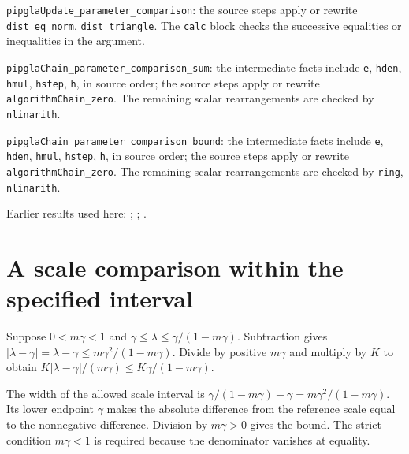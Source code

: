 \documentclass[11pt,a4paper]{article}
\begin{document}
\begin{leanbox}
\texttt{pipgla\allowbreak{}Update\_\allowbreak{}parameter\_\allowbreak{}comparison}: the source steps apply or rewrite \texttt{dist\_\allowbreak{}eq\_\allowbreak{}norm}, \texttt{dist\_\allowbreak{}triangle}. The \texttt{calc} block checks the successive equalities or inequalities in the argument.



\texttt{pipgla\allowbreak{}Chain\_\allowbreak{}parameter\_\allowbreak{}comparison\_\allowbreak{}sum}: the intermediate facts include \texttt{e}, \texttt{hden}, \texttt{hmul}, \texttt{hstep}, \texttt{h}, in source order; the source steps apply or rewrite \texttt{algorithm\allowbreak{}Chain\_\allowbreak{}zero}. The remaining scalar rearrangements are checked by \texttt{nlinarith}.



\texttt{pipgla\allowbreak{}Chain\_\allowbreak{}parameter\_\allowbreak{}comparison\_\allowbreak{}bound}: the intermediate facts include \texttt{e}, \texttt{hden}, \texttt{hmul}, \texttt{hstep}, \texttt{h}, in source order; the source steps apply or rewrite \texttt{algorithm\allowbreak{}Chain\_\allowbreak{}zero}. The remaining scalar rearrangements are checked by \texttt{ring}, \texttt{nlinarith}.
\end{leanbox}


Earlier results used here: \cite[Section~3.15.1]{LangevinLean2026ULASC}; \cite[Section~3.15.3]{LangevinLean2026ULASC}; \cite[Section~3.1.1]{LangevinLean2026IPLA}.

\section{\texorpdfstring{A scale comparison within the specified interval}{A scale comparison within the specified interval}}


Suppose \(0<m\gamma<1\) and \(\gamma\le\lambda\le\gamma/(1-m\gamma)\). Subtraction gives \(|\lambda-\gamma|=\lambda-\gamma\le m\gamma^2/(1-m\gamma)\). Divide by positive \(m\gamma\) and multiply by \(K\) to obtain \(K|\lambda-\gamma|/(m\gamma)\le K\gamma/(1-m\gamma)\).



The width of the allowed scale interval is \(\gamma/(1-m\gamma)-\gamma=m\gamma^2/(1-m\gamma)\). Its lower endpoint \(\gamma\) makes the absolute difference from the reference scale equal to the nonnegative difference. Division by \(m\gamma>0\) gives the bound. The strict condition \(m\gamma<1\) is required because the denominator vanishes at equality.
\end{document}
